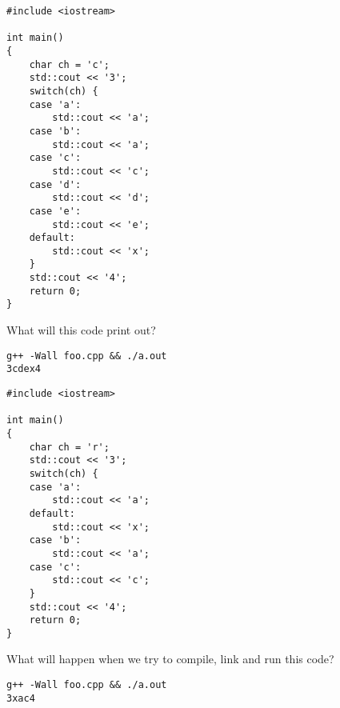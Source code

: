 \documentclass[landscape]{slides}
\begin{document}

\begin{slide}
\begin{lstlisting}
#include <iostream>

int main() 
{
    char ch = 'c';
    std::cout << '3';
    switch(ch) {
    case 'a':
        std::cout << 'a';
    case 'b':
        std::cout << 'a';
    case 'c':
        std::cout << 'c';
    case 'd':
        std::cout << 'd';
    case 'e':
        std::cout << 'e';
    default:
        std::cout << 'x';
    }
    std::cout << '4';
    return 0;
}
\end{lstlisting}

What will this code print out?

\begin{note}
\begin{tiny}
\begin{verbatim}
g++ -Wall foo.cpp && ./a.out
3cdex4
\end{verbatim}
\end{tiny}
\end{note}

\end{slide}


\begin{slide}
\begin{lstlisting}
#include <iostream>

int main() 
{
    char ch = 'r';
    std::cout << '3';
    switch(ch) {
    case 'a':
        std::cout << 'a';
    default:
        std::cout << 'x';
    case 'b':
        std::cout << 'a';
    case 'c':
        std::cout << 'c';
    }
    std::cout << '4';
    return 0;
}
\end{lstlisting}

What will happen when we try to compile, link and run this code?

\begin{note}
\begin{tiny}
\begin{verbatim}
g++ -Wall foo.cpp && ./a.out
3xac4
\end{verbatim}
\end{tiny}
\end{note}

\end{slide}

\end{document}
